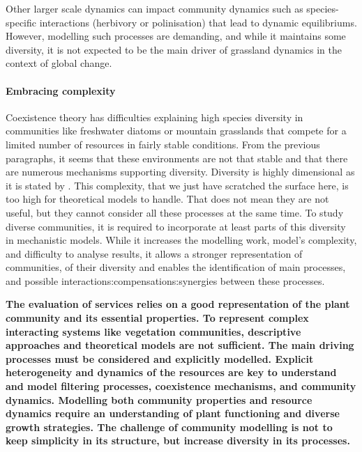 Other larger scale dynamics can impact community dynamics such as species-specific interactions (herbivory or polinisation) that lead to dynamic equilibriums. However, modelling such processes are demanding, and while it maintains some diversity, it is not expected to be the main driver of grassland dynamics in the context of global change.


\paragraph{Embracing complexity}

Coexistence theory has difficulties explaining high species diversity in communities like freshwater diatoms or mountain grasslands that compete for a limited number of resources in fairly stable conditions. From the previous paragraphs, it seems that these environments are not that stable and that there are numerous mechanisms supporting diversity. Diversity is highly dimensional as it is stated by \cite{clark_resolving_2007}. This complexity, that we just have scratched the surface here, is too high for theoretical models to handle. That does not mean they are not useful, but they cannot consider all these processes at the same time. To study diverse communities, it is required to incorporate at least parts of this diversity in mechanistic models. While it increases the modelling work, model's complexity, and difficulty to analyse results, it allows a stronger representation of communities, of their diversity and enables the identification of main processes, and possible interactions:compensations:synergies between these processes.



 
 \textbf{The evaluation of services relies on a good representation of the plant community and its essential properties. To represent complex interacting systems like vegetation communities, descriptive approaches and theoretical models are not sufficient. The main driving processes must be considered and explicitly modelled. Explicit heterogeneity and dynamics of the resources are key to understand and model filtering processes, coexistence mechanisms, and community dynamics. Modelling both community properties and resource dynamics require an understanding of plant functioning and diverse growth strategies. The challenge of community modelling is not to keep simplicity in its structure, but increase diversity in its processes.}
 
